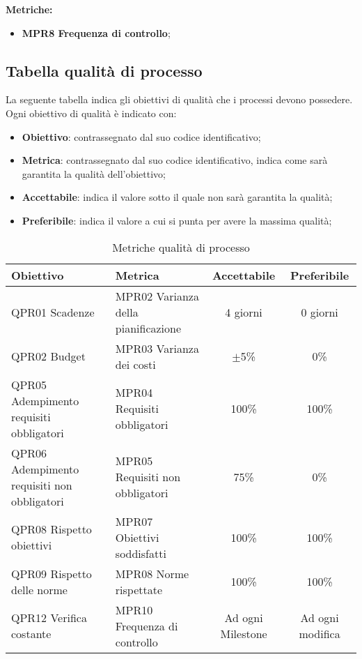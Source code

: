 \documentclass[../piano_di_qualifica.tex]{subfiles}
\begin{document}
\textbf{Metriche:}
\smallbreak
\begin{itemize}
	\item \textbf{MPR8 Frequenza di controllo};
\end{itemize}

\subsection{Tabella qualità di processo}
La seguente tabella indica gli obiettivi di qualità che i processi devono possedere.\\
Ogni obiettivo di qualità è indicato con:
\smallbreak
\begin{itemize}
	\item \textbf{Obiettivo}: contrassegnato dal suo codice identificativo;
	\item \textbf{Metrica}: contrassegnato dal suo codice identificativo, indica come sarà garantita la qualità dell'obiettivo;
	\item \textbf{Accettabile}: indica il valore sotto il quale non sarà garantita la qualità;
	\item \textbf{Preferibile}: indica il valore a cui si punta per avere la massima qualità;
\end{itemize}

\begin{table}[!ht]
	\centering
	\begin{tabular}{|p{3.5cm}|p{3.5cm}|c|c|}
		\hline
		\rowcolor{lightgray}
		\textbf{Obiettivo}  & \textbf{Metrica} & \textbf{Accettabile} & \textbf{Preferibile} \\
		\hline
		QPR01 Scadenze & MPR02 Varianza della pianificazione  & 4 giorni  & 0 giorni   \\
		\hline
		QPR02 Budget   & MPR03 Varianza dei costi   &  $\pm$5\%    & 0\%  \\
		\hline
		QPR05 Adempimento requisiti obbligatori  & MPR04 Requisiti obbligatori     & 100\%  & 100\%   \\
		\hline
		QPR06 Adempimento requisiti non obbligatori & MPR05 Requisiti non obbligatori & 75\%   & 0\%     \\
		\hline
		QPR08 Rispetto obiettivi   & MPR07 Obiettivi soddisfatti     & 100\%   & 100\%   \\
		\hline
		QPR09 Rispetto delle norme  & MPR08 Norme rispettate   & 100\%  & 100\%   \\
		\hline
		QPR12 Verifica costante   & MPR10 Frequenza di controllo    & Ad ogni Milestone    & Ad ogni modifica     \\
		\hline
	\end{tabular}
	\caption{Metriche qualità di processo}
\end{table}
\end{document}
